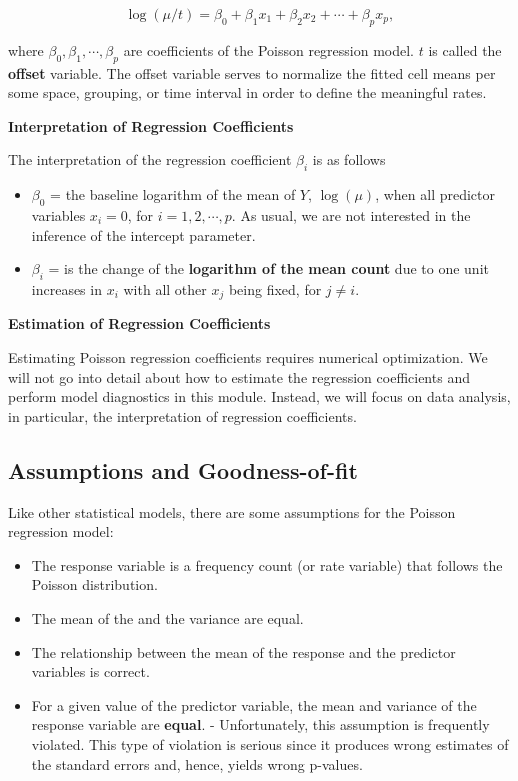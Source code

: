 \documentclass[
]{book}
\begin{document}
\[
\log(\mu/t) = \beta_0 + \beta_1 x_1 + \beta_2 x_2 + \cdots + \beta_p x_p,
\]

where \(\beta_0, \beta_1, \cdots, \beta_p\) are coefficients of the Poisson regression model. \(t\) is called the \textbf{offset} variable. The offset variable serves to normalize the fitted cell means per some space, grouping, or time interval in order to define the meaningful rates.

\textbf{Interpretation of Regression Coefficients}

The interpretation of the regression coefficient \(\beta_i\) is as follows

\begin{itemize}
\item
  \(\beta_0\) = the baseline logarithm of the mean of \(Y\), \(\log(\mu)\), when all predictor variables \(x_i = 0\), for \(i = 1, 2, \cdots, p\). As usual, we are not interested in the inference of the intercept parameter.
\item
  \(\beta_i\) = is the change of the \textbf{logarithm of the mean count} due to one unit increases in \(x_i\) with all other \(x_j\) being fixed, for \(j\ne i\).
\end{itemize}

\textbf{Estimation of Regression Coefficients}

Estimating Poisson regression coefficients requires numerical optimization. We will not go into detail about how to estimate the regression coefficients and perform model diagnostics in this module. Instead, we will focus on data analysis, in particular, the interpretation of regression coefficients.

\hypertarget{assumptions-and-goodness-of-fit}{%
\subsection{Assumptions and Goodness-of-fit}\label{assumptions-and-goodness-of-fit}}

Like other statistical models, there are some assumptions for the Poisson regression model:

\begin{itemize}
\item
  The response variable is a frequency count (or rate variable) that follows the Poisson distribution.
\item
  The mean of the and the variance are equal.
\item
  The relationship between the mean of the response and the predictor variables is correct.
\item
  For a given value of the predictor variable, the mean and variance of the response variable are \textbf{equal}. - Unfortunately, this assumption is frequently violated. This type of violation is serious since it produces wrong estimates of the standard errors and, hence, yields wrong p-values.
\end{itemize}
\end{document}
